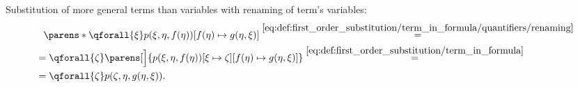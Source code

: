 \begin{example}
\begin{exenum}
     Substitution of more general terms than variables with renaming of term's variables:
    \begin{align*}
      &{}\phantom{=}{}
      \parens*{\qforall{\xi} p(\xi, \eta, f(\eta))}[f(\eta) \mapsto g(\eta, \xi)]
      \overset {\eqref{eq:def:first_order_substitution/term_in_formula/quantifiers/renaming}} = \\ &=
      \qforall{\zeta} \parens[\Big]{p(\xi, \eta, f(\eta))[\xi \mapsto \zeta][f(\eta) \mapsto g(\eta, \xi)]}
      \overset {\eqref{eq:def:first_order_substitution/term_in_formula}} = \\ &=
      \qforall{\zeta} p(\zeta, \eta, g(\eta, \xi)).
    \end{align*}
  \end{exenum}
\end{example}

